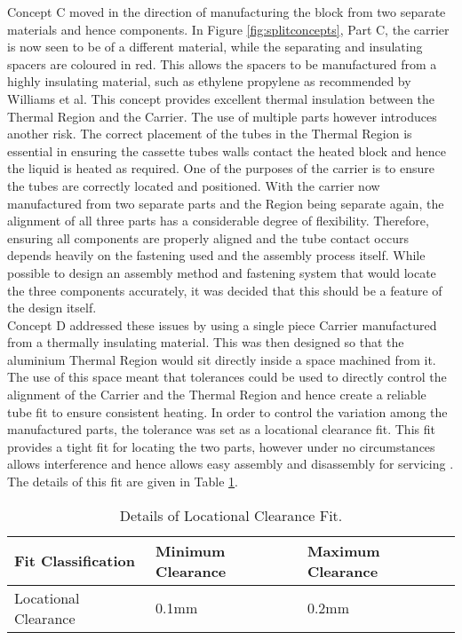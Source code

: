 Concept C moved in the direction of manufacturing the block from two separate materials and hence components. In Figure \ref{fig:splitconcepts}, Part C, the carrier is now seen to be of a different material, while the separating and insulating spacers are coloured in red. This allows the spacers to be manufactured from a highly insulating material, such as ethylene propylene as recommended by Williams et al. This concept provides excellent thermal insulation between the Thermal Region and the Carrier. The use of multiple parts however introduces another risk. The correct placement of the tubes in the Thermal Region is essential in ensuring the cassette tubes walls contact the heated block and hence the liquid is heated as required. One of the purposes of the carrier is to ensure the tubes are correctly located and positioned. With the carrier now manufactured from two separate parts and the Region being separate again, the alignment of all three parts has a considerable degree of flexibility. Therefore, ensuring all components are properly aligned and the tube contact occurs depends heavily on the fastening used and the assembly process itself. While possible to design an assembly method and fastening system that would locate the three components accurately, it was decided that this should be a feature of the design itself.\\

Concept D addressed these issues by using a single piece Carrier manufactured from a thermally insulating material. This was then designed so that the aluminium Thermal Region would sit directly inside a space machined from it. The use of this space meant that tolerances could be used to directly control the alignment of the Carrier and the Thermal Region and hence create a reliable tube fit to ensure consistent heating. In order to control the variation among the manufactured parts, the tolerance was set as a locational clearance fit. This fit provides a tight fit for locating the two parts, however under no circumstances allows interference and hence allows easy assembly and disassembly for servicing \cite{mmto}. The details of this fit are given in Table \ref{tab:fit}.

\begin{table}[h!]
\begin{center}
\begin{tabular}{ p{4.2cm} |  p{4.2cm} | p{4.2cm} }
\hline
Fit Classification & Minimum Clearance & Maximum Clearance\\ \hline \hline
Locational Clearance & 0.1mm & 0.2mm\\ \hline
\end{tabular}
\end{center}
\caption[Fit Tolerance Details.]{Details of Locational Clearance Fit.}
\label{tab:fit}
\end{table}


